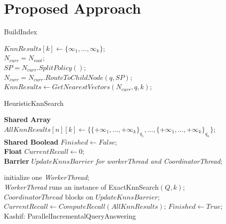 \section{Proposed Approach}
\label{sec:system-architecture}

\small
\begin{algorithm}
	\DontPrintSemicolon
	\caption{{\sc BuildIndex}}
	\label{algo:build_index}
\end{algorithm}

\small
\begin{algorithm}
	\DontPrintSemicolon
	\vspace{.2cm}
	$KnnResults[k] \gets \{\infty_{1}, ..., \infty_{k}\}$;\\
	$N_{curr} = N_{root}$;\\
	\vspace{.2cm}
	{
		$SP = N_{curr}.SplitPolicy()$;\\
		$N_{curr} = N_{curr}.RouteToChildNode(q, SP)$;\\
		
	}
	$KnnResults \gets GetNearestVectors(N_{curr}, q, k)$;\\
	\caption{{\sc HeuristicKnnSearch}}
	\label{algo:heuristic_knn_search}
\end{algorithm}


\small
\begin{algorithm}
	\DontPrintSemicolon %
	\vspace{.2cm}
	\textbf{Shared Array} $AllKnnResults[n][k] \gets \{\{+\infty_{1}, ..., +\infty_{k}\}_{q_{1}}, ..., \{+\infty_{1}, ..., +\infty_{k}\}_{q_{n}}\}$;\\
	\textbf{Shared Boolead} $Finished \gets False$;\\
	\textbf{Float} $CurrentRecall \gets 0$;\\
	\textbf{Barrier} $UpdateKnnsBarrier$ {\it for workerThread and CoordinatorThread};\\
	
	\vspace{.2cm}
	
	
	initialize one {\it WorkerThread};\\
	{\it WorkerThread} runs an instance of {\sc ExactKnnSearch$(Q, k)$};\\
	{ 
		$CoordinatorThread$ blocks on $UpdateKnnsBarrier$;\\
		$CurrentRecall \gets ComputeRecall(AllKnnResults)$;
	}
	$Finished \gets True$;\\
	\caption{{\sc Kashif: ParallelIncrementalQueryAnswering}}
	\label{algo:query_answering}
\end{algorithm}


